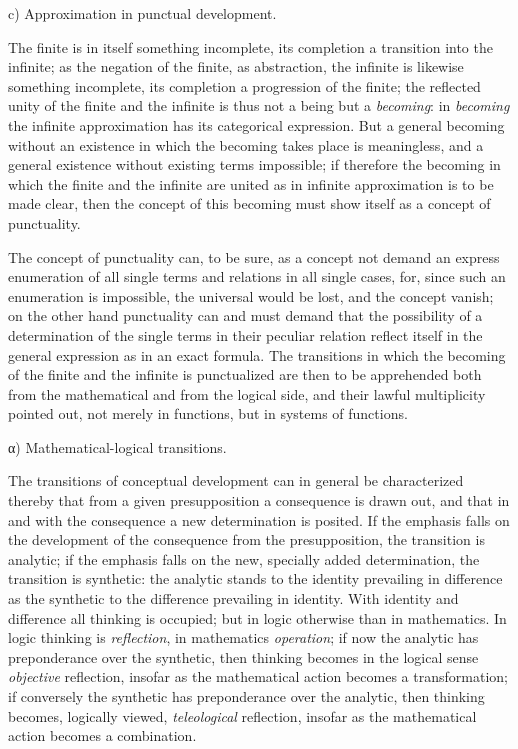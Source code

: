 \documentclass[12pt,a4paper,openany]{book}
\newcommand{\opage}[1]{\marginnote{\footnotesize\textit{[#1]}}}
\begin{document}
\begin{center}c) Approximation in punctual development.\end{center}

The finite is in itself something incomplete, its completion a transition into the infinite; as the negation of the finite, as abstraction, the infinite is likewise something incomplete, its completion a progression of the finite; the reflected unity of the finite and the infinite is thus not a being but a \emph{becoming}: in \emph{becoming} the infinite approximation has its categorical expression. But a general becoming without an existence in which the becoming takes place is
\setcounter{footnote}{0}%
\opage{39}meaningless, and a general existence without existing terms impossible; if therefore the becoming in which the finite and the infinite are united as in infinite approximation is to be made clear, then the concept of this becoming must show itself as a concept of punctuality.

The concept of punctuality can, to be sure, as a concept not demand an express enumeration of all single terms and relations in all single cases, for, since such an enumeration is impossible, the universal would be lost, and the concept vanish; on the other hand punctuality can and must demand that the possibility of a determination of the single terms in their peculiar relation reflect itself in the general expression as in an exact formula. The transitions in which the becoming of the finite and the infinite is punctualized are then to be apprehended both from the mathematical and from the logical side, and their lawful multiplicity pointed out, not merely in functions, but in systems of functions.

\begin{center}α) Mathematical-logical transitions.\end{center}

The transitions of conceptual development can in general be characterized thereby that from a given presupposition a consequence is drawn out, and that in and with the consequence a new determination is posited. If the emphasis falls on the development of the consequence from the presupposition, the transition is analytic; if the emphasis falls on the new, specially added determination, the transition is synthetic: the analytic stands to the identity prevailing in difference as the synthetic to the difference prevailing in identity. With identity and difference all thinking is occupied; but in logic otherwise than in mathematics. In logic thinking is \emph{reflection}, in mathematics \emph{operation}; if now the analytic has preponderance over the synthetic, then thinking becomes in the logical sense \emph{objective} reflection, insofar as the mathematical action becomes a transformation; if conversely the synthetic has preponderance over the analytic, then
\setcounter{footnote}{0}%
\opage{40}thinking becomes, logically viewed, \emph{teleological} reflection, insofar as the mathematical action becomes a combination.
\end{document}
